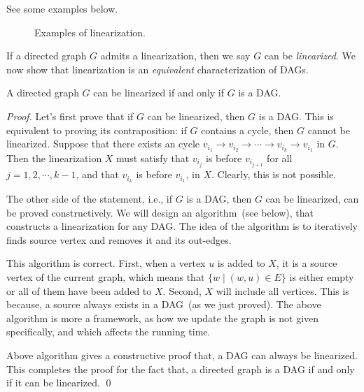 See some examples below.

\begin{figure}[h!]
\centering{}
\caption{Examples of linearization.}
\end{figure}

If a directed graph $G$ admits a linearization, then we say $G$ can be \emph{linearized}.
We now show that linearization is an \emph{equivalent} characterization of DAGs.

\begin{claim}
A directed graph $G$ can be linearized if and only if $G$ is a DAG.
\label{claim:dag}
\end{claim}

\emph{Proof.}  Let's first prove that if $G$ can be linearized, then $G$ is a DAG.
This is equivalent to proving its contraposition: if $G$ contains a cycle, then $G$ cannot be linearized.
Suppose that there exists an cycle $v_{i_1} \to v_{i_2} \to \cdots \to v_{i_k} \to v_{i_1}$ in $G$.
Then the linearization $X$ must satisfy that $v_{i_{j}}$ is before $v_{i_{j+1}}$ for all $j = 1, 2, \cdots, k-1$,
and that $v_{i_{k}}$ is before $v_{i_1}$, in $X$. Clearly, this is not possible.

The other side of the statement, i.e., if $G$ is a DAG, then $G$ can be linearized, can be proved constructively.
We will design an algorithm~(see below), that constructs a linearization for any DAG. 
The idea of the algorithm is to iteratively
finds source vertex and removes it and its out-edges.

\begin{minipage}{0.8\textwidth}
	\xxx
	\xxx
	\xxx
	\xxx
	\xxx
	\xxx
	\xxx
	\xxx
\end{minipage}

This algorithm is correct. First, when a vertex $u$ is added to $X$,
it is a source vertex of the current graph, which means that
$\{w\mid (w, u)\in E\}$ is either empty or all of them
have been added to $X$. Second, $X$ will include all vertices.
This is because, a source always exists in a DAG~(as we just proved).
The above algorithm is more a framework, as how we update the graph
is not given specifically, and which affects the running time.

Above algorithm gives a constructive proof that, a DAG can always
be linearized. This completes the proof for the fact that, a directed graph is a DAG if and only if it can be linearized.
\qed

